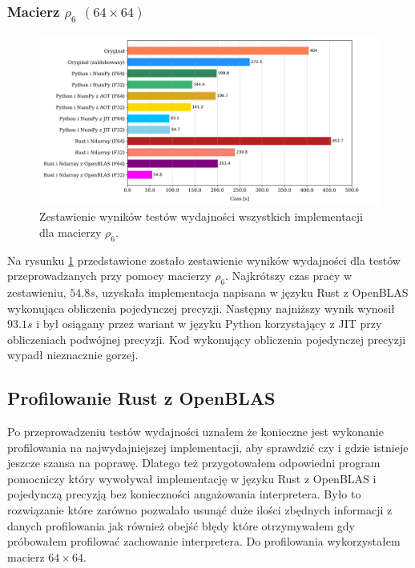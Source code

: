 \documentclass[11pt, a4paper]{article}
\begin{document}
\begin{sloppypar}
    \subsubsection{Macierz \texorpdfstring{$\rho_{6}$ $(64\times64)$}{rho6 64x64}}
    \begin{figure}[ht]
      \centering
      \includegraphics[width=1.0\textwidth]{"resources/rho_6_matrix_comparison.png"}
      \caption{Zestawienie wyników testów wydajności wszystkich implementacji dla macierzy $\rho
      _{6}$.}
      \label{matrix-comparison-rho-6-plot}
    \end{figure}
    Na rysunku \ref{matrix-comparison-rho-6-plot} przedstawione zostało zestawienie
    wyników wydajności dla testów przeprowadzanych przy pomocy macierzy $\rho_{6}$. Najkrótszy
    czas pracy w zestawieniu, $54.8s$, uzyskała implementacja napisana w języku Rust z OpenBLAS
    wykonująca obliczenia pojedynczej precyzji. Następny najniższy wynik wynosił $93.1s$
    i był osiągany przez wariant w języku Python korzystający z JIT przy obliczeniach
    podwójnej precyzji. Kod wykonujący obliczenia pojedynczej precyzji wypadł nieznacznie
    gorzej.

    \FloatBarrier

    \subsection{Profilowanie Rust z OpenBLAS}


    Po przeprowadzeniu testów wydajności uznałem że konieczne jest wykonanie
    profilowania na najwydajniejszej implementacji, aby sprawdzić czy i gdzie istnieje jeszcze
    szansa na poprawę. Dlatego też przygotowałem odpowiedni program pomocniczy który
    wywoływał implementację w języku Rust z OpenBLAS i pojedynczą precyzją bez
    konieczności angażowania interpretera. Było to rozwiązanie które zarówno pozwalało usunąć
    duże ilości zbędnych informacji z danych profilowania jak również obejść błędy które
    otrzymywałem gdy próbowałem profilować zachowanie interpretera. Do profilowania
    wykorzystałem macierz $64\times64$.


\end{sloppypar}
\end{document}
